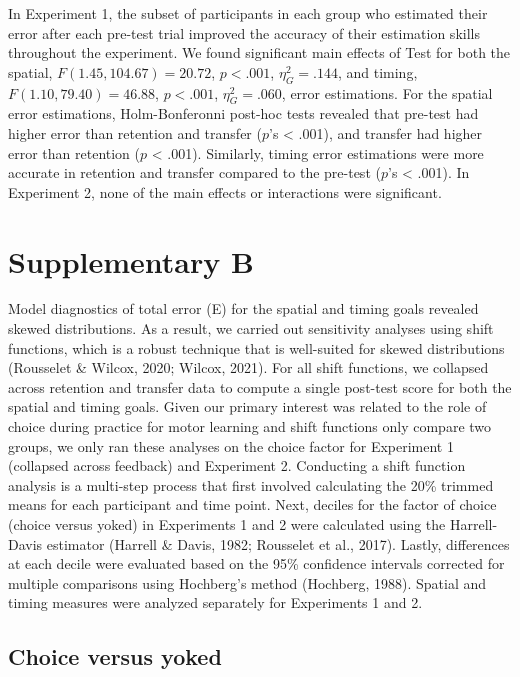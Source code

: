 \documentclass[
  man, donotrepeattitle,floatsintext]{apa7}
\begin{document}
In Experiment 1, the subset of participants in each group who estimated their error after each pre-test trial improved the accuracy of their estimation skills throughout the experiment. We found significant main effects of Test for both the spatial, \(F(1.45,104.67) = 20.72\), \(p < .001\), \(\eta_{G}^2 = .144\), and timing, \(F(1.10,79.40) = 46.88\), \(p < .001\), \(\eta_{G}^2 = .060\), error estimations. For the spatial error estimations, Holm-Bonferonni post-hoc tests revealed that pre-test had higher error than retention and transfer (\(p\)'s \textless{} .001), and transfer had higher error than retention (\(p\) \textless{} .001). Similarly, timing error estimations were more accurate in retention and transfer compared to the pre-test (\(p\)'s \textless{} .001). In Experiment 2, none of the main effects or interactions were significant.

\newpage

\hypertarget{supplementary-b}{%
\section{Supplementary B}\label{supplementary-b}}

Model diagnostics of total error (E) for the spatial and timing goals revealed skewed distributions. As a result, we carried out sensitivity analyses using shift functions, which is a robust technique that is well-suited for skewed distributions (Rousselet \& Wilcox, 2020; Wilcox, 2021). For all shift functions, we collapsed across retention and transfer data to compute a single post-test score for both the spatial and timing goals. Given our primary interest was related to the role of choice during practice for motor learning and shift functions only compare two groups, we only ran these analyses on the choice factor for Experiment 1 (collapsed across feedback) and Experiment 2. Conducting a shift function analysis is a multi-step process that first involved calculating the 20\% trimmed means for each participant and time point. Next, deciles for the factor of choice (choice versus yoked) in Experiments 1 and 2 were calculated using the Harrell-Davis estimator (Harrell \& Davis, 1982; Rousselet et al., 2017). Lastly, differences at each decile were evaluated based on the 95\% confidence intervals corrected for multiple comparisons using Hochberg's method (Hochberg, 1988). Spatial and timing measures were analyzed separately for Experiments 1 and 2.

\hypertarget{choice-versus-yoked}{%
\subsection{Choice versus yoked}\label{choice-versus-yoked}}
\end{document}
